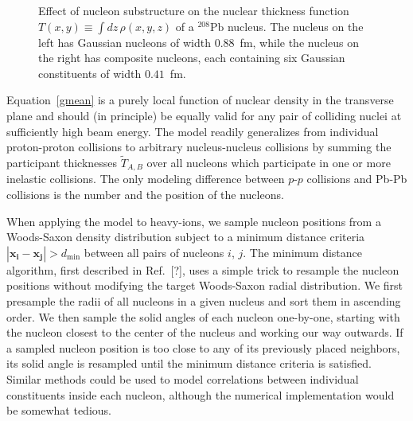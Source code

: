 \documentclass[aps,prc,reprint,amsmath,nofootinbib]{revtex4-1}
\newcommand{\T}{\tilde{T}}
\newcommand{\note}{\textcolor{theblue}{[?]}}
\begin{document}
\begin{figure}
  \centering
  \caption{\label{fig:substructure} Effect of nucleon substructure on the nuclear thickness function $T(x, y) \equiv \int dz\, \rho(x, y, z)$ of a $^{208}\mathrm{Pb}$ nucleus.
    The nucleus on the left has Gaussian nucleons of width $0.88$~fm, while the nucleus on the right has composite nucleons, each containing six Gaussian constituents of width $0.41$~fm.}
\end{figure}

Equation~\eqref{gmean} is a purely local function of nuclear density in the transverse plane and should (in principle) be equally valid for any pair of colliding nuclei at sufficiently high beam energy.
The model readily generalizes from individual proton-proton collisions to arbitrary nucleus-nucleus collisions by summing the participant thicknesses $\T_{A,B}$ over all nucleons which participate in one or more inelastic collisions.
The only modeling difference between $p$-$p$ collisions and Pb-Pb collisions is the number and the position of the nucleons.

When applying the model to heavy-ions, we sample nucleon positions from a Woods-Saxon density distribution subject to a minimum distance criteria $|\mathbf{x_i} - \mathbf{x_j}| > d_\mathrm{min}$ between all pairs of nucleons $i$, $j$.
The minimum distance algorithm, first described in Ref.~\note, uses a simple trick to resample the nucleon positions without modifying the target Woods-Saxon radial distribution.
We first presample the radii of all nucleons in a given nucleus and sort them in ascending order.
We then sample the solid angles of each nucleon one-by-one, starting with the nucleon closest to the center of the nucleus and working our way outwards.
If a sampled nucleon position is too close to any of its previously placed neighbors, its solid angle is resampled until the minimum distance criteria is satisfied.
Similar methods could be used to model correlations between individual constituents inside each nucleon, although the numerical implementation would be somewhat tedious.
\end{document}
